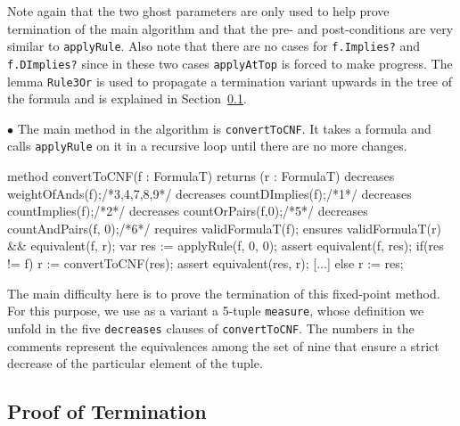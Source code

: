 \documentclass[12pt]{report}
\begin{document}
Note again that the two ghost parameters are only used to help prove
termination of the main algorithm and that the pre- and
post-conditions are very similar to \texttt{applyRule}. Also note that
there are no cases for \texttt{f.Implies?} and \texttt{f.DImplies?}
since in these two cases \texttt{applyAtTop} is forced to make
progress. The lemma \texttt{Rule3Or} is used to propagate a
termination variant upwards in the tree of the formula and is
explained in Section~\ref{sec:termination}.

\( \bullet \) The main method in the algorithm is
\texttt{convertToCNF}. It takes a formula and calls \texttt{applyRule}
on it in a recursive loop until there are no more changes.

\begin{dafny}
method convertToCNF(f : FormulaT) returns (r : FormulaT)
  decreases weightOfAnds(f);/*3,4,7,8,9*/ decreases countDImplies(f);/*1*/
  decreases countImplies(f);/*2*/         decreases countOrPairs(f,0);/*5*/
  decreases countAndPairs(f, 0);/*6*/     requires validFormulaT(f);
  ensures validFormulaT(r) && equivalent(f, r);
{ var res := applyRule(f, 0, 0); assert equivalent(f, res);
  if(res != f) { r := convertToCNF(res);
                assert equivalent(res, r); [...]
  } else { r := res; } }
\end{dafny}

The main difficulty here is to prove the termination of this
fixed-point method. For this purpose, we use as a variant a 5-tuple
\texttt{measure}, %
whose definition we unfold in the five \texttt{decreases} clauses of
\texttt{convertToCNF}. The numbers in the comments represent the
equivalences among the set of nine that ensure a strict decrease of
the particular element of the tuple.

\subsection{Proof of Termination}
\label{sec:termination}
\end{document}
